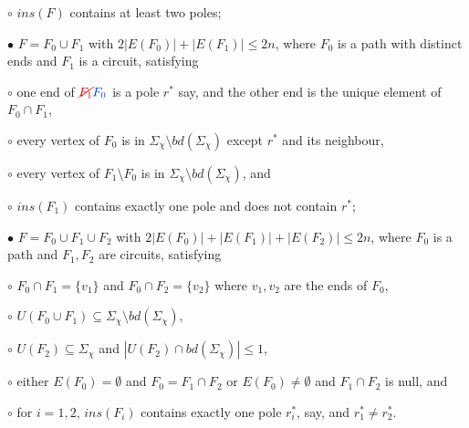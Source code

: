\hspace*{24pt}$\circ$ $ins(F)$ contains at least two poles;

\hspace*{12pt}$\bullet$ $F = F_0 \cup F_1$ with $2|E(F_0)| + |E(F_1)| \le 2n$, where $F_0$ is a path with distinct ends and $F_1$ is a circuit, satisfying

\hspace*{24pt}$\circ$ one end of $\delm{F_1}\fix{F_0}$ is a pole $r^*$ say, and the other end is the unique element of $F_0 \cap F_1$,

\hspace*{24pt}$\circ$ every vertex of $F_0$ is in $\Sigma_\chi \setminus bd(\Sigma_\chi)$ except $r^*$ and its neighbour,

\hspace*{24pt}$\circ$ every vertex of $F_1 \setminus F_0$ is in $\Sigma_\chi \setminus bd(\Sigma_\chi)$, and

\hspace*{24pt}$\circ$ $ins(F_1)$ contains exactly one pole and does not contain $r^*$;

\hspace*{12pt}$\bullet$ $F = F_0 \cup F_1 \cup F_2$ with $2|E(F_0)| + |E(F_1)| + |E(F_2)| \le 2n$, where $F_0$ is a path and $F_1, F_2$ are circuits, satisfying

\hspace*{24pt}$\circ$ $F_0 \cap F_1 = \{v_1\}$ and $F_0 \cap F_2 = \{v_2\}$ where $v_1, v_2$ are the ends of $F_0$,

\hspace*{24pt}$\circ$ $U(F_0 \cup F_1) \subseteq \Sigma_\chi \setminus bd(\Sigma_\chi)$,

\hspace*{24pt}$\circ$ $U(F_2) \subseteq \Sigma_\chi$ and $|U(F_2) \cap bd(\Sigma_\chi)| \le 1$,

\hspace*{24pt}$\circ$ either $E(F_0) = \emptyset$ and $F_0 = F_1 \cap F_2$ or $E(F_0) \ne \emptyset$ and $F_1 \cap F_2$ is null, and

\hspace*{24pt}$\circ$ for $i = 1, 2$, $ins(F_i)$ contains exactly one pole $r_i^*$, say, and $r_1^* \ne r_2^*$.


